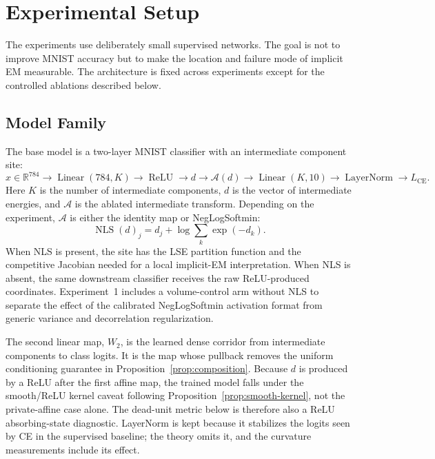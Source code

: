 \section{Experimental Setup}
\label{sec:setup}
The experiments use deliberately small supervised networks. The goal is not to
improve MNIST accuracy but to make the location and failure mode of implicit
EM measurable. The architecture is fixed across experiments except for the
controlled ablations described below.

\subsection{Model Family}
The base model is a two-layer MNIST classifier with an intermediate component
site:
\[
    x \in \mathbb{R}^{784}
    \rightarrow
    \operatorname{Linear}(784,K)
    \rightarrow
    \operatorname{ReLU}
    \rightarrow
    d
    \rightarrow
    \mathcal{A}(d)
    \rightarrow
    \operatorname{Linear}(K,10)
    \rightarrow
    \operatorname{LayerNorm}
    \rightarrow
    L_{\mathrm{CE}}.
\]
Here $K$ is the number of intermediate components, $d$ is the vector of
intermediate energies, and $\mathcal{A}$ is the ablated intermediate
transform. Depending on the experiment, $\mathcal{A}$ is either the identity
map or NegLogSoftmin:
\[
    \operatorname{NLS}(d)_j
    =
    d_j+\log\sum_k\exp(-d_k).
\]
When NLS is present, the site has the LSE partition function and the
competitive Jacobian needed for a local implicit-EM interpretation. When NLS
is absent, the same downstream classifier receives the raw ReLU-produced
coordinates. Experiment~1 includes a volume-control arm without NLS to
separate the effect of the calibrated NegLogSoftmin activation format from
generic variance and decorrelation regularization.

The second linear map, $W_2$, is the learned dense corridor from intermediate
components to class logits. It is the map whose pullback removes the uniform
conditioning guarantee in Proposition~\ref{prop:composition}. Because $d$ is
produced by a ReLU after the first affine map, the trained model falls under
the smooth/ReLU kernel caveat following Proposition~\ref{prop:smooth-kernel},
not the private-affine case alone. The dead-unit metric below is therefore
also a ReLU absorbing-state diagnostic. LayerNorm is kept because it
stabilizes the logits seen by CE in the supervised baseline; the theory omits
it, and the curvature measurements include its effect.

